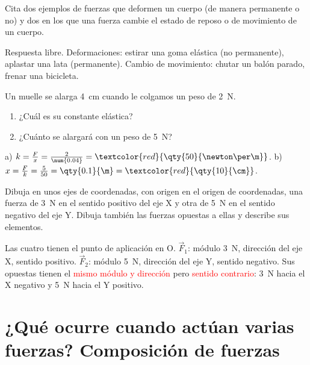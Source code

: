 \begin{exercise}
    Cita dos ejemplos de fuerzas que deformen un cuerpo (de manera permanente o no) y dos en los que una fuerza cambie el estado de reposo o de movimiento de un cuerpo.
    \begin{solu}
        Respuesta libre. Deformaciones: estirar una goma elástica (no permanente), aplastar una lata (permanente). Cambio de movimiento: chutar un balón parado, frenar una bicicleta.
    \end{solu}
\end{exercise}

\begin{exercise}
    Un muelle se alarga \qty{4}{\cm} cuando le colgamos un peso de \qty{2}{\newton}.
    \begin{enumerate}[label=\alph*)]
        \item ¿Cuál es su constante elástica?
        \item ¿Cuánto se alargará con un peso de \qty{5}{\newton}?
    \end{enumerate}
    \begin{solu}
        a) \(k = \frac{F}{x} = \frac{2}{\num{0.04}} = \textcolor{red}{\qty{50}{\newton\per\m}}\). b) \(x = \frac{F}{k} = \frac{5}{50} = \qty{0.1}{\m} = \textcolor{red}{\qty{10}{\cm}}\).
    \end{solu}
\end{exercise}

\begin{exercise}
    Dibuja en unos ejes de coordenadas, con origen en el origen de coordenadas, una fuerza de \qty{3}{\newton} en el sentido positivo del eje X y otra de \qty{5}{\newton} en el sentido negativo del eje Y. Dibuja también las fuerzas opuestas a ellas y describe sus elementos.
    \begin{solu}
        Las cuatro tienen el punto de aplicación en O. \(\vec{F}_1\): módulo \qty{3}{\newton}, dirección del eje X, sentido positivo. \(\vec{F}_2\): módulo \qty{5}{\newton}, dirección del eje Y, sentido negativo. Sus opuestas tienen el \textcolor{red}{mismo módulo y dirección} pero \textcolor{red}{sentido contrario}: \qty{3}{\newton} hacia el X negativo y \qty{5}{\newton} hacia el Y positivo.
    \end{solu}
\end{exercise}

\section{¿Qué ocurre cuando actúan varias fuerzas? Composición de fuerzas}

